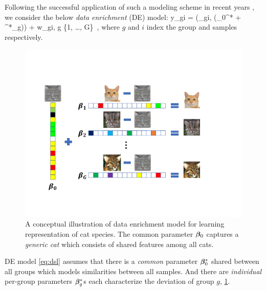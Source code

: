 Following the successful application of such a modeling scheme in recent years \cite{domu16, grti16,  olvi14, olvi15}, we consider the below \emph{data enrichment} (DE) model: 
\beq
\label{eq:dsl}
y_{gi} = \phi(\x_{gi}, (\bbeta_0^* + \bbeta^*_g)) + w_{gi}, \quad g \in \{1, \dots, G\}~,
\eeq
where $g$ and $i$ index the group and samples respectively. 
\begin{figure}%
	\centering
	\includegraphics[scale=.45]{./img/concept.pdf}
	\caption{A conceptual illustration of data enrichment model for learning representation of  cat species. The common parameter $\boldsymbol{\beta}_0$ captures a \emph{generic cat} which consists of shared features among all cats.}
	\label{fig:cat}		
\end{figure}
DE model \cref{eq:dsl} assumes that there is a \emph{common} parameter $\boldsymbol{\beta}^*_0$ shared between all groups which models similarities between all samples. And there are \emph{individual} per-group parameters $\boldsymbol{\beta}_g^*$s each characterize the deviation of group $g$, \cref{fig:cat}.%

